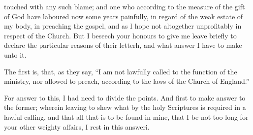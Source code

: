 touched with any such blame; and one who according to the measure of the gift of God have laboured now some years painfully, in regard of the weak estate of my body, in preaching the gospel, and as I hope not altogether unprofitably in respect of the Church. But I beseech your honours to give me leave briefly to declare the particular reasons of their letterh, and what answer I have to make unto it.

The first is, that, as they say, “I am not lawfully called to the function of the ministry, nor allowed to preach, according to the laws of the Church of England.”

For answer to this, I had need to divide the points. And first to make answer to the former; wherein leaving to shew what by the holy Scriptures is required in a lawful calling, and that all that is to be found in mine, that I be not too long for your other weighty affairs, I rest in this answeri.

